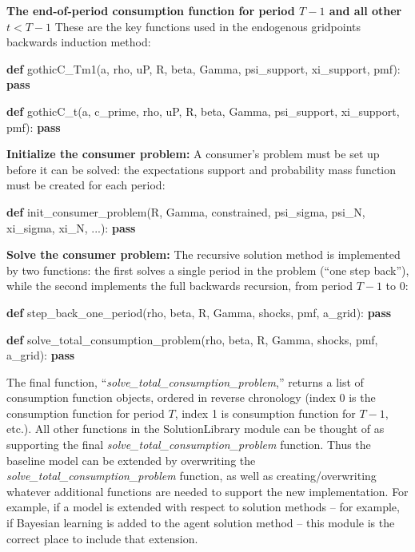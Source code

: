 \documentclass[]{article}
\newenvironment{Shaded}{}{}
\newcommand{\KeywordTok}[1]{\textcolor[rgb]{0.00,0.44,0.13}{\textbf{{#1}}}}
\newcommand{\NormalTok}[1]{{#1}}
\begin{document}
\textbf{The end-of-period consumption function for period $T-1$ and all
other $t < T-1$} These are the key functions used in the endogenous
gridpoints backwards induction method:

\begin{Shaded}
\begin{Highlighting}[]
\KeywordTok{def} \NormalTok{gothicC_Tm1(a, rho, uP, R, beta, Gamma, psi_support, xi_support, pmf):}
    \KeywordTok{pass}

\KeywordTok{def} \NormalTok{gothicC_t(a, c_prime, rho, uP, R, beta, Gamma, psi_support, xi_support, pmf):}
    \KeywordTok{pass}
\end{Highlighting}
\end{Shaded}

\textbf{Initialize the consumer problem:} A consumer's problem must be
set up before it can be solved: the expectations support and probability
mass function must be created for each period:

\begin{Shaded}
\begin{Highlighting}[]
\KeywordTok{def} \NormalTok{init_consumer_problem(R, Gamma, constrained,}
                          \NormalTok{psi_sigma, psi_N, xi_sigma, xi_N, ...):}
    \KeywordTok{pass}
\end{Highlighting}
\end{Shaded}

\textbf{Solve the consumer problem:} The recursive solution method is
implemented by two functions: the first solves a single period in the
problem (``one step back''), while the second implements the full
backwards recursion, from period $T-1$ to $0$:

\begin{Shaded}
\begin{Highlighting}[]
\KeywordTok{def} \NormalTok{step_back_one_period(rho, beta, R, Gamma, shocks, pmf, a_grid):}
    \KeywordTok{pass}

\KeywordTok{def} \NormalTok{solve_total_consumption_problem(rho, beta, R, Gamma, shocks, pmf, a_grid):}
    \KeywordTok{pass}
\end{Highlighting}
\end{Shaded}

The final function, ``\emph{solve\_total\_consumption\_problem},''
returns a list of consumption function objects, ordered in reverse
chronology (index 0 is the consumption function for period $T$, index 1
is consumption function for $T-1$, etc.). All other functions in the
SolutionLibrary module can be thought of as supporting the final
\emph{solve\_total\_consumption\_problem} function. Thus the baseline
model can be extended by overwriting the
\emph{solve\_total\_consumption\_problem} function, as well as
creating/overwriting whatever additional functions are needed to support
the new implementation. For example, if a model is extended with respect
to solution methods -- for example, if Bayesian learning is added to the
agent solution method -- this module is the correct place to include
that extension.
\end{document}
